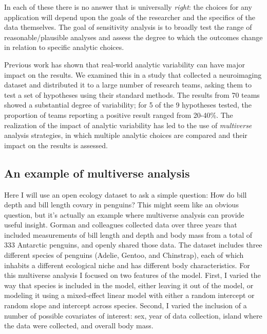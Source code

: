 In each of these there is no answer that is universally \textit{right}: the choices for any application will depend upon the goals of the researcher and the specifics of the data themselves. The goal of sensitivity analysis is to broadly test the range of reasonable/plausible analyses and assess the degree to which the outcomes change in relation to specific analytic choices.

Previous work has shown that real-world analytic variability can have major impact on the results.  We \citep{Botvinik-Nezer:2020aa} examined this in a study that collected a neuroimaging dataset and distributed it to a large number of research teams, asking them to test a set of hypotheses using their standard methods.  The results from 70 teams showed a substantial degree of variability; for 5 of the 9 hypotheses tested, the proportion of teams reporting a positive result ranged from 20-40\%.  The realization of the impact of analytic variability has led to the use of \textit{multiverse} analysis strategies, in which multiple analytic choices are compared and their impact on the results is assessed.

\subsection{An example of multiverse analysis}

Here I will use an open ecology dataset to ask a simple question: How do bill depth and bill length covary in penguins?  This might seem like an obvious question, but it's actually an example where multiverse analysis can provide useful insight.  Gorman and colleagues \citep{Gorman:2014aa} collected data over three years that included measurements of bill length and depth and body mass from a total of 333 Antarctic penguins, and openly shared those data.  The dataset includes three different species of penguins (Adelie, Gentoo, and Chinstrap), each of which inhabits a different ecological niche and has different body characteristics.  For this multiverse analysis I focused on two features of the model. First, I varied the way that species is included in the model, either leaving it out of the model, or modeling it using a mixed-effect linear model with either a random intercept or random slope and intercept across species.  Second, I varied the inclusion of a number of possible covariates of interest: sex, year of data collection, island where the data were collected, and overall body mass.

